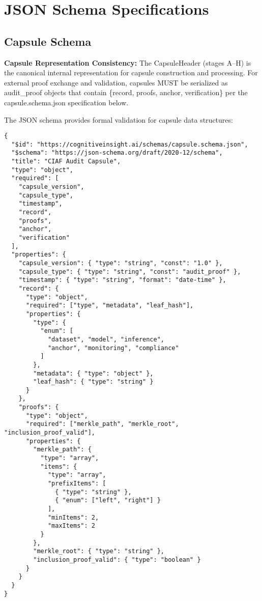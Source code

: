 \documentclass[12pt,a4paper]{article}
\begin{document}
\section{JSON Schema Specifications}

\subsection{Capsule Schema}

\textbf{Capsule Representation Consistency:} The CapsuleHeader (stages A–H) is the canonical internal representation for capsule construction and processing. For external proof exchange and validation, capsules MUST be serialized as audit\_proof objects that contain \{record, proofs, anchor, verification\} per the capsule.schema.json specification below.

The JSON schema provides formal validation for capsule data structures:

\begin{lstlisting}[caption=Capsule JSON Schema]
{
  "$id": "https://cognitiveinsight.ai/schemas/capsule.schema.json",
  "$schema": "https://json-schema.org/draft/2020-12/schema",
  "title": "CIAF Audit Capsule",
  "type": "object",
  "required": [
    "capsule_version",
    "capsule_type", 
    "timestamp",
    "record",
    "proofs",
    "anchor",
    "verification"
  ],
  "properties": {
    "capsule_version": { "type": "string", "const": "1.0" },
    "capsule_type": { "type": "string", "const": "audit_proof" },
    "timestamp": { "type": "string", "format": "date-time" },
    "record": {
      "type": "object",
      "required": ["type", "metadata", "leaf_hash"],
      "properties": {
        "type": { 
          "enum": [
            "dataset", "model", "inference", 
            "anchor", "monitoring", "compliance"
          ] 
        },
        "metadata": { "type": "object" },
        "leaf_hash": { "type": "string" }
      }
    },
    "proofs": {
      "type": "object",
      "required": ["merkle_path", "merkle_root", "inclusion_proof_valid"],
      "properties": {
        "merkle_path": { 
          "type": "array", 
          "items": { 
            "type": "array", 
            "prefixItems": [
              { "type": "string" }, 
              { "enum": ["left", "right"] }
            ], 
            "minItems": 2, 
            "maxItems": 2 
          } 
        },
        "merkle_root": { "type": "string" },
        "inclusion_proof_valid": { "type": "boolean" }
      }
    }
  }
}
\end{lstlisting}
\end{document}
